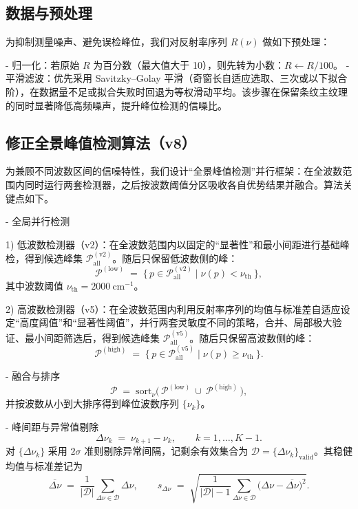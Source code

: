 \documentclass{ctexart} %
\begin{document}
\subsection{数据与预处理}
为抑制测量噪声、避免误检峰位，我们对反射率序列 \(R(\nu)\) 做如下预处理：

- 归一化：若原始 \(R\) 为百分数（最大值大于 10），则先转为小数：\(R\leftarrow R/100\)。
- 平滑滤波：优先采用 Savitzky–Golay 平滑（奇窗长自适应选取、三次或以下拟合阶），在数据量不足或拟合失败时回退为等权滑动平均。该步骤在保留条纹主纹理的同时显著降低高频噪声，提升峰位检测的信噪比。

\subsection{修正全景峰值检测算法（v8）}
为兼顾不同波数区间的信噪特性，我们设计“全景峰值检测”并行框架：在全波数范围内同时运行两套检测器，之后按波数阈值分区吸收各自优势结果并融合。算法关键点如下。

- 全局并行检测

1) 低波数检测器（v2）：在全波数范围内以固定的“显著性”和最小间距进行基础峰检，得到候选峰集 \(\mathcal{P}_{\mathrm{all}}^{(\mathrm{v2})}\)。随后只保留低波数侧的峰：
\[
    \mathcal{P}^{(\mathrm{low})} \;=\; \{\,p\in\mathcal{P}_{\mathrm{all}}^{(\mathrm{v2})} \mid \nu(p) < \nu_{\mathrm{th}}\ \},
\]
其中波数阈值 \(\nu_{\mathrm{th}}=2000~\mathrm{cm}^{-1}\)。

2) 高波数检测器（v5）：在全波数范围内利用反射率序列的均值与标准差自适应设定“高度阈值”和“显著性阈值”，并行两套灵敏度不同的策略，合并、局部极大验证、最小间距筛选后，得到候选峰集 \(\mathcal{P}_{\mathrm{all}}^{(\mathrm{v5})}\)。随后只保留高波数侧的峰：
\[
    \mathcal{P}^{(\mathrm{high})} \;=\; \{\,p\in\mathcal{P}_{\mathrm{all}}^{(\mathrm{v5})} \mid \nu(p) \ge \nu_{\mathrm{th}}\ \}.
\]

- 融合与排序
\[
    \mathcal{P} \;=\; \mathrm{sort}_\nu\big(\,\mathcal{P}^{(\mathrm{low})}\ \cup\ \mathcal{P}^{(\mathrm{high})}\,\big),
\]
并按波数从小到大排序得到峰位波数序列 \(\{\nu_k\}\)。

- 峰间距与异常值剔除
\[
    \Delta\nu_k \;=\; \nu_{k+1}-\nu_k,\qquad k=1,\dots, K-1.
\]
对 \(\{\Delta\nu_k\}\) 采用 \(2\sigma\) 准则剔除异常间隔，记剩余有效集合为 \(\mathcal{D}=\{\Delta\nu_k\}_{\mathrm{valid}}\)。其稳健均值与标准差记为
\[
    \overline{\Delta\nu} \;=\; \frac{1}{|\mathcal{D}|}\sum_{\Delta\nu\in\mathcal{D}} \Delta\nu,\qquad
    s_{\Delta\nu} \;=\; \sqrt{\frac{1}{|\mathcal{D}|-1}\sum_{\Delta\nu\in\mathcal{D}}\big(\Delta\nu-\overline{\Delta\nu}\big)^2}.
\]
\end{document}
